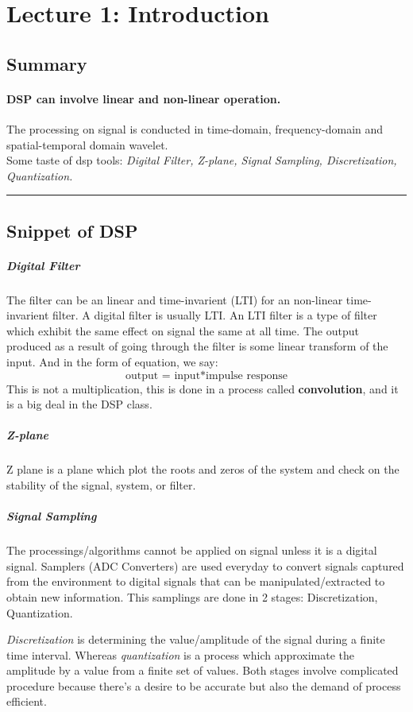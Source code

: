 

\section*{Lecture 1: Introduction}
\subsection*{Summary}
\paragraph{DSP can involve linear and non-linear operation.}
The processing on signal is conducted in time-domain, frequency-domain and spatial-temporal domain wavelet. \\Some taste of dsp tools: \textit{Digital Filter, Z-plane, Signal Sampling, Discretization, Quantization.}
\vspace{5pt}
\hrule
\subsection*{Snippet of DSP}
\subparagraph*{Digital Filter}
The filter can be an linear and time-invarient (LTI) for an non-linear time-invarient filter. A digital filter is usually LTI. An LTI filter is a type of filter which exhibit the same effect on signal the same at all time.
The output  produced as a result of going through the filter is some linear transform of the input. And in the form of equation, we say:
$$\text{output = input} \ast \text{impulse response}$$
This is not a multiplication, this is done in a process called \textbf{convolution}, and it is a big deal in the DSP class.
\subparagraph*{Z-plane}
Z plane is a plane which plot the roots and zeros of the system and check on the stability of the signal, system, or filter.
\subparagraph*{Signal Sampling}
The processings/algorithms cannot be applied on signal unless it is a digital signal. Samplers (ADC Converters) are used everyday to convert signals captured from the environment to digital signals that can be manipulated/extracted to obtain new information. This samplings are done in 2 stages: Discretization, Quantization.

\textit{Discretization} is determining the value/amplitude of the signal during a finite time interval. Whereas \textit{quantization} is a process which approximate the amplitude by a value from a finite set of values. Both stages involve complicated procedure because there's a desire to be accurate but also the demand of process efficient.

